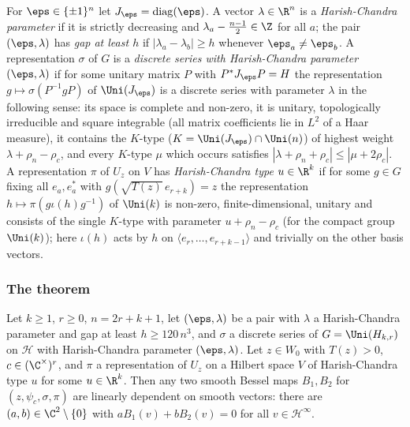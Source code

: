 \begin{definition}\label{pf:sh-local:def:ds}
For $\eps\in\{\pm1\}^n$ let $J_\eps=\mathrm{diag}(\eps)$. A vector $\lambda\in\R^n$ is a \emph{Harish-Chandra
parameter} if it is strictly decreasing and $\lambda_a-\frac{n-1}2\in\Z$ for all $a$; the pair $(\eps,\lambda)$
has \emph{gap at least $h$} if $|\lambda_a-\lambda_b|\ge h$ whenever $\eps_a\ne\eps_b$. A representation $\sigma$
of $G$ is a \emph{discrete series with Harish-Chandra parameter $(\eps,\lambda)$} if for some unitary matrix $P$
with $P^*J_\eps P=H$ the representation $g\mapsto\sigma(P^{-1}gP)$ of $\Uni(J_\eps)$ is a discrete series with
parameter $\lambda$ in the following sense: its space is complete and non-zero, it is unitary, topologically
irreducible and square integrable (all matrix coefficients lie in $L^2$ of a Haar measure), it contains the
$K$-type ($K=\Uni(J_\eps)\cap\Uni(n)$) of highest weight $\lambda+\rho_n-\rho_c$, and every $K$-type $\mu$ which
occurs satisfies $|\lambda+\rho_n+\rho_c|\le|\mu+2\rho_c|$. A representation $\pi$ of $U_z$ on $V$ has
\emph{Harish-Chandra type $u\in\R^k$} if for some $g\in G$ fixing all $e_a,e_a^*$ with
$g(\sqrt{T(z)}\,e_{r+k})=z$ the representation $h\mapsto\pi(g\iota(h)g^{-1})$ of $\Uni(k)$ is non-zero,
finite-dimensional, unitary and consists of the single $K$-type with parameter $u+\rho_n-\rho_c$ (for the
compact group $\Uni(k)$); here $\iota(h)$ acts by $h$ on $\langle e_r,\dots,e_{r+k-1}\rangle$ and trivially on
the other basis vectors.
\end{definition}

\subsubsection{The theorem}

\begin{theorem}\label{pf:sh-local:bmu}
Let $k\ge1$, $r\ge0$, $n=2r+k+1$, let $(\eps,\lambda)$ be a pair with $\lambda$ a Harish-Chandra parameter and
gap at least $h\ge120\,n^3$, and $\sigma$ a discrete series of $G=\Uni(H_{k,r})$ on $\mathcal H$ with
Harish-Chandra parameter $(\eps,\lambda)$. Let $z\in W_0$ with $T(z)>0$, $c\in(\C^\times)^r$, and $\pi$ a
representation of $U_z$ on a Hilbert space $V$ of Harish-Chandra type $u$ for some $u\in\R^k$. Then any two
smooth Bessel maps $B_1,B_2$ for $(z,\psi_c,\sigma,\pi)$ are linearly dependent on smooth vectors: there are
$(a,b)\in\C^2\setminus\{0\}$ with $aB_1(v)+bB_2(v)=0$ for all $v\in\mathcal H^\infty$.
\end{theorem}

